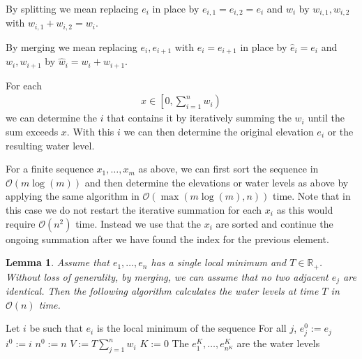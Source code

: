 \documentclass[11pt,a4paper]{article}
\newtheorem{lem}{Lemma}
\newcommand{\bO}{\mathcal{O}}
\newcommand{\Rp}{\mathbb{R}_+}
\begin{document}
By splitting we mean replacing $e_i$ in place by $e_{i,1} = e_{i,2} = e_i$ and $w_i$ by $w_{i,1}, w_{i,2}$ with $w_{i,1} + w_{i,2} = w_i$.

By merging we mean replacing $e_i, e_{i+1}$ with $e_i = e_{i+1}$ in place by $\hat{e}_i = e_i$ and $w_i, w_{i+1}$ by $\hat{w}_i = w_i + w_{i+1}$.

For each
\begin{align*}
    x \in \left[0, \sum_{i=1}^n w_i\right)
\end{align*}
we can determine the $i$ that contains it by iteratively summing the $w_i$ until the sum exceeds $x$.
With this $i$ we can then determine the original elevation $e_i$ or the resulting water level.

For a finite sequence $x_1,\ldots,x_m$ as above, we can first sort the sequence in $\bO(m\log(m))$ and then determine the elevations or water levels as above by applying the same algorithm in $\bO(\max(m\log(m), n))$ time.
Note that in this case we do not restart the iterative summation for each $x_i$ as this would require $\bO(n^2)$ time.
Instead we use that the $x_i$ are sorted and continue the ongoing summation after we have found the index for the previous element.

\begin{lem}
    Assume that $e_1,\ldots,e_n$ has a single local minimum and $T\in\Rp$.
    Without loss of generality, by merging, we can assume that no two adjacent $e_j$ are identical.
    Then the following algorithm calculates the water levels at time $T$ in $\bO(n)$ time.
\end{lem}

\begin{algorithm}[H]
    Let $i$ be such that $e_i$ is the local minimum of the sequence\; \label{a1:minimum}
    For all $j$, $e_j^0 := e_j$\;
    $i^0 := i$\;
    $n^0 := n$\;
    $V := T\sum_{j=1}^n w_i$\;
    $K := 0$\;
    The $e_1^K,\ldots,e_{n^K}^K$ are the water levels\;
\end{algorithm}
\end{document}
